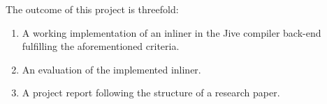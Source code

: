 \documentclass{article}
\begin{document}
The outcome of this project is threefold:

\begin{enumerate}
	\item A working implementation of an inliner in the Jive compiler back-end fulfilling the
		aforementioned criteria.
	\item An evaluation of the implemented inliner.
	\item A project report following the structure of a research paper.
\end{enumerate}
\end{document}
